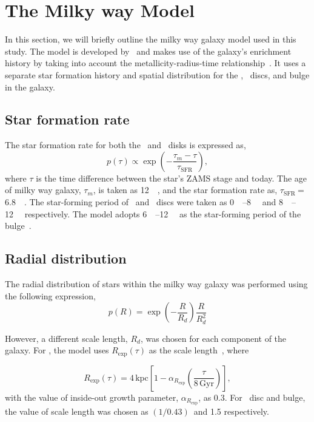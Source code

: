 \section{The Milky way Model}
\label{sec:milky_way}
In this section, we will briefly outline the milky way galaxy model used in this study.
The model is developed by~\cite{Wagg2021LW} and makes use of the galaxy's enrichment history by taking
into account the metallicity-radius-time relationship~\citep{Frankel2018}.
It uses a separate star formation history and spatial distribution for the \lowalpha, \highalpha\ discs, and bulge in the galaxy.

\subsection{Star formation rate}
\label{subsec:star_formation_rate}
The star formation rate for both the \lowalpha\ and \highalpha\ disks is expressed as,
\begin{equation}
    p(\tau) \propto \exp\left(-\frac{\tau_m - \tau}{\tau_\text{SFR}}\right),
    \label{eq:star_formation_rate_equation}
\end{equation}
where $\tau$ is the time difference between the star's ZAMS stage and today.
The age of milky way galaxy, $\tau_m$, is taken as \SI{12}{\giga\yr}, and the star formation rate as, $\tau_\text{
    SFR}\ $= \SI{6.8}{\giga\yr}.
The star-forming period of \lowalpha\ and \highalpha\ discs were taken as \SIrange{0}{8}{\giga\yr} and \SIrange{8}{12}{\giga\yr} respectively.
The model adopts \SIrange{6}{12}{\giga\yr} as the star-forming period of the bulge~\citep{Bovy2019}.

\subsection{Radial distribution}
\label{subsec:radial_distribution}
The radial distribution of stars within the milky way galaxy was performed using the following expression,
\begin{equation}%
    p(R) = \exp\left(-\frac{R}{R_d}\right)\frac{R}{R_d^2}
    \label{eq:radial_distribution_of_stars}
\end{equation}%

However, a different scale length, $R_d$, was chosen for each component of the galaxy.
For \lowalpha, the model uses $R_\text{exp}(\tau)$ as the scale length~\cite[Eq 6]{Frankel2018}, where

\begin{equation}%
    R_\text{exp}(\tau) = 4\,\text{kpc}\left[1 - \alpha_{R_\text{exp}}\left(\frac{\tau}{8\,\text{Gyr}}\right)\right],
    \label{eq:exponential_radius_equation}
\end{equation}%
with the value of inside-out growth parameter, $\alpha_{R_\text{exp}}$, as 0.3. For \highalpha\ disc and bulge, the value of scale length was chosen as $(1/0.43)\,$\si{\kpc} and \SI{1.5}{\kpc} respectively.


